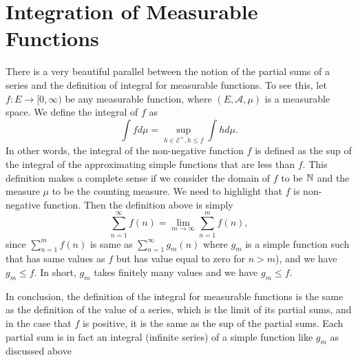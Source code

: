 \chapter{Integration of Measurable Functions}

\begin{remark}
	There is a very beautiful parallel between the notion of the partial sums of a series and the definition of integral for measurable functions. To see this, let $ f: E \to [0,\infty) $ be any measurable function, where $ (E,\mathcal{A}, \mu) $ is a measurable space. We define the integral of $ f $ as 
	\[ \int f d\mu = \sup_{h\in\mathcal{E}^+, h\leq f} \int h d\mu. \]
	In other words, the integral of the non-negative function $ f $ is defined as the sup of the integral of the approximating simple functions that are less than $ f $. This definition makes a complete sense if we consider the domain of $ f $ to be $ \mathbb{N} $ and the measure $ \mu $ to be the counting measure. We need to highlight that $ f $ is non-negative function. Then the definition above is simply
	\[ \sum_{n=1}^{\infty}f(n) = \lim_{m\to\infty} \sum_{n=1}^m f(n), \]
	since $ \sum_{n=1}^{m} f(n) $ is same as $ \sum_{n=1}^{\infty} g_m(n) $ where $ g_m $ is a simple function such that has same values as $ f $ but has value equal to zero for $ n>m $), and we have $ g_m\leq f $. In short, $ g_m $ takes finitely many values and we have $ g_m\leq f $. 
	
	In conclusion, the definition of the integral for measurable functions is the same as the definition of the value of a series, which is the limit of its partial sums, and in the case that $ f $ is positive, it is the same as the sup of the partial sums. Each partial sum is in fact an integral (infinite series) of a simple function like $ g_m $ as discussed above
\end{remark}